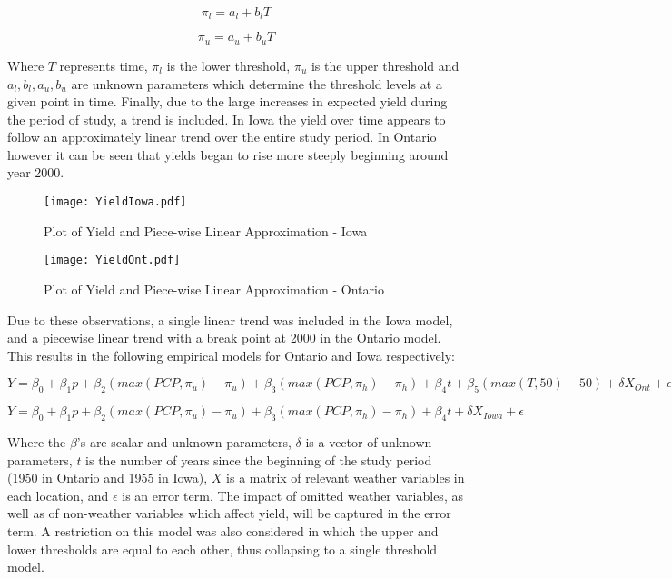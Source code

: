 \begin{equation}
\pi_l = a_l + b_lT
\end{equation}

\begin{equation}
\pi_u = a_u + b_uT
\end{equation}

Where $T$ represents time, $\pi_l$ is the lower threshold, $\pi_u$ is the upper threshold and $a_l,b_l,a_u,b_u$ are unknown parameters which determine the threshold levels at a given point in time. Finally, due to the large increases in expected yield during the period of study, a trend is included. In Iowa the yield over time appears to follow an approximately linear trend over the entire study period. In Ontario however it can be seen that yields began to rise more steeply beginning around year 2000.

    
\begin{figure}[!hb]
  \centering
  \begin{minipage}[b]{0.49\textwidth}
    \texttt{[image: YieldIowa.pdf]}
    \caption{Plot of Yield and Piece-wise Linear Approximation - Iowa}
  \end{minipage}
  \hfill
  \begin{minipage}[b]{0.49\textwidth}
    \texttt{[image: YieldOnt.pdf]}
    \caption{Plot of Yield and Piece-wise Linear Approximation - Ontario}
  \end{minipage}
\end{figure}   
 
    
 Due to these observations, a single linear trend was included in the Iowa model, and a piecewise linear trend with a break point at 2000 in the Ontario model. This results in the following empirical models for Ontario and Iowa respectively:

\begin{equation}
Y=\beta_0+\beta_1p+\beta_2(max(PCP,\pi_u)-\pi_u)+\beta_3(max(PCP,\pi_h)-\pi_h)+\beta_4t+\beta_5(max(T,50)-50)+\delta X_{Ont}+\epsilon
\end{equation}

\begin{equation}
Y=\beta_0+\beta_1p+\beta_2(max(PCP,\pi_u)-\pi_u)+\beta_3(max(PCP,\pi_h)-\pi_h)+\beta_4t+\delta X_{Iowa}+\epsilon
\end{equation}

Where the $\beta$'s are scalar and unknown parameters, $\delta$ is a vector of unknown parameters, $t$ is the number of years since the beginning of the study period (1950 in Ontario and 1955 in Iowa), $X$ is a matrix of relevant weather variables in each location, and $\epsilon$ is an error term. The impact of omitted weather variables, as well as  of non-weather variables which affect yield, will be captured in the error term. A restriction on this model was also considered in which the upper and lower thresholds are equal to each other, thus collapsing to a single threshold model.


